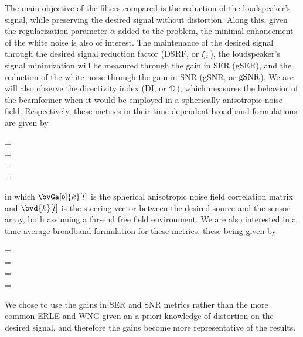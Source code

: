 The main objective of the filters compared is the reduction of the loudspeaker's signal, while preserving the desired signal without distortion. Along this, given the regularization parameter $\alpha$ added to the problem, the minimal enhancement of the white noise is also of interest. The maintenance of the desired signal through the desired signal reduction factor (DSRF, or $\xi_{x}$), the loudspeaker's signal minimization will be measured through the gain in SER (gSER), and the reduction of the white noise through the gain in SNR (gSNR, or $\text{gSNR}$). We are will also observe the directivity index (DI, or $\mathcal{D}$), which measures the behavior of the beamformer when it would be employed in a spherically anisotropic noise field. Respectively, these metrics in their time-dependent broadband formulations are given by
\begin{subgather}
	\dsrf[l] =  \\
	\gser[l] =  \cdot {}\\
	\gsnr[l] =  \cdot {} \\
	\di[l] = 
\end{subgather}
in which $\bvGa[b]{k}[l]$ is the spherical anisotropic noise field correlation matrix \cite{habets_generating_2007} and $\bvd{k}[l]$ is the steering vector between the desired source and the sensor array, both assuming a far-end free field environment. We are also interested in a time-average broadband formulation for these metrics, these being given by
\begin{subgather}
	\dsrf =  \\
	\gser =  \cdot {} \\
	\gsnr =  \cdot {} \\
	\di = 
\end{subgather}

We chose to use the gains in SER and SNR metrics rather than the more common ERLE and WNG \cite{wada_enhancement_2012} given an a priori knowledge of distortion on the desired signal, and therefore the gains become more representative of the results.

